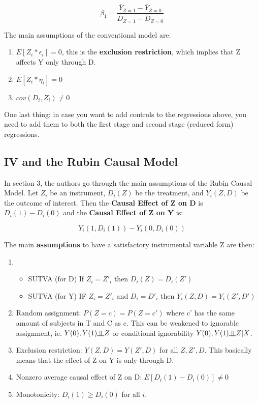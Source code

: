 \documentclass[12 pt, leqno]{article}
\newcommand{\indep}{\rotatebox[origin=c]{90}{$\models$}}
\begin{document}
$$\beta_1 = \frac{\bar{Y}_{Z = 1} - \bar{Y}_{Z = 0}}{\bar{D}_{Z = 1} - \bar{D}_{Z = 0}}$$ 

The main assumptions of the conventional model are:

\begin{enumerate}
\item $E[Z_i * \epsilon_i] = 0$, this is the \textbf{exclusion restriction}, which implies that Z affects Y only through D.
\item $E[Z_i * \eta_i] = 0$
\item $cov(D_i, Z_i) \neq 0$
\end{enumerate}

One last thing: in case you want to add controls to the regressions above, you need to add them to both the first stage and second stage (reduced form) regressions. 

\subsection{IV and the Rubin Causal Model}

In section 3, the authors go through the main assumptions of the Rubin Causal Model. Let $Z_i$ be an instrument, $D_i(Z)$ be the treatment, and $Y_i(Z,D)$ be the outcome of interest. Then the \textbf{Causal Effect of Z on D} is $D_i(1) - D_i(0)$ and the \textbf{Causal Effect of Z on Y} is:

$$Y_i(1, D_i(1)) - Y_i(0, D_i(0)) $$

The main \textbf{assumptions} to have a satisfactory instrumental variable Z are then:

\begin{enumerate}
\item  
	\begin{itemize}
	\item SUTVA (for D) If $Z_i = Z'_i$ then $D_i(Z) = D_i(Z')$
	\item SUTVA (for Y) IF $Z_i = Z'_i$ and $D_i = D'_i$ then $Y_i(Z,D) = Y_i(Z', D')$ 
	\end{itemize}
\item Random assignment: $P(Z = c) = P(Z = c')$ where c' has the same amount of subjects in T and C as c. This can be weakened to ignorable assignment, ie. $Y(0), Y(1) \indep Z$ or conditional ignorability $Y(0), Y(1) \indep Z | X$. 
\item Exclusion restriction: $Y(Z,D) = Y(Z',D)$ for all $Z, Z', D$. This basically means that the effect of Z on Y is only through D.
\item Nonzero average causal effect of Z on D: $E[D_i(1) - D_i(0)] \neq 0$
\item Monotonicity: $D_i(1) \geq D_i(0)$ for all $i$. 
\end{enumerate}
\end{document}
